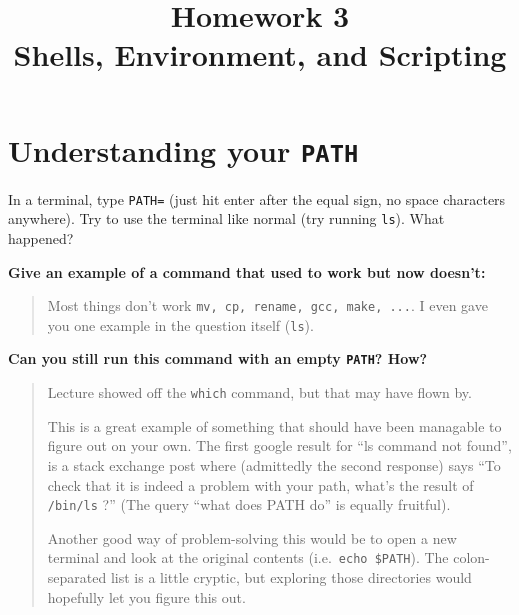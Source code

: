 \documentclass{article}
\begin{document}
\fancyhead[L]{}
\fancyhead[R]{}

\fancyfoot[C]{\thepage~/~\pageref*{LastPage}}
\pagestyle{fancyplain}


\title{\textbf{Homework 3\\Shells, Environment, and Scripting}}
\date{}
\maketitle



\section{Understanding your \texttt{PATH}}

In a terminal, type \texttt{PATH=} (just hit enter after the equal sign, no
space characters anywhere). Try to use the terminal like normal (try running
\texttt{ls}). What happened?

\textbf{Give an example of a command that used to work but now doesn't:}
\begin{quote}
  \color{violet}
  Most things don't work \texttt{mv, cp, rename, gcc, make, ...}. I even gave
  you one example in the question itself (\texttt{ls}).
\end{quote}

\textbf{Can you still run this command with an empty \texttt{PATH}? How?}
\begin{quote}
  \color{violet}
  Lecture showed off the \texttt{which} command, but that may have flown by.

  This is a great example of something that should have been managable to
  figure out on your own.
  The first google result for ``ls command not found'', is a stack exchange
  post where (admittedly the second response) says ``To check that it is
  indeed a problem with your path, what's the result of \texttt{/bin/ls} ?''
  (The query ``what does PATH do'' is equally fruitful).

  Another good way of problem-solving this would be to open a new terminal and
  look at the original contents (i.e.\ \texttt{echo \$PATH}). The
  colon-separated list is a little cryptic, but exploring those directories
  would hopefully let you figure this out.
\end{quote}
\end{document}
